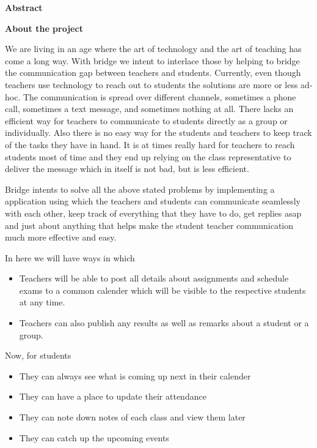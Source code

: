 \vspace{2in}

\LARGE{\bfseries{Abstract}}

\hspace{1in}

\Large{\bfseries{About the project}}

\hspace{1in}

\normalsize
We are living in an age where the art of technology and the art of teaching has come a long way. With bridge we intent to interlace those by helping to bridge the communication gap between teachers and students. Currently, even though teachers use technology to reach out to students the solutions are more or less ad-hoc. The communication is spread over different channels, sometimes a phone call, sometimes a text message, and sometimes nothing at all. There lacks an efficient way for teachers to communicate to students directly as a group or individually. Also there is no easy way for the students and teachers to keep track of the tasks they have in hand. It is at times really hard for teachers to reach students most of time and they end up relying on the class representative to deliver the message which in itself is not bad, but is less efficient.

Bridge intents to solve all the above stated problems by implementing a application using which the teachers and students can communicate seamlessly with each other, keep track of everything that they have to do, get replies asap and just about anything that helps make the student teacher communication much more effective and easy.

In here we will have ways in which
\begin{itemize}
\item Teachers will be able to post all details about assignments and schedule exams to a common calender which will be visible to the respective students at any time.
\item Teachers can also publish any results as well as remarks about a student or a group.
\end{itemize}
Now, for students

\begin{itemize}
\item They can always see what is coming up next in their calender
\item They can have a place to update their attendance
\item They can note down notes of each class and view them later
\item They can catch up the upcoming events
\end{itemize}

